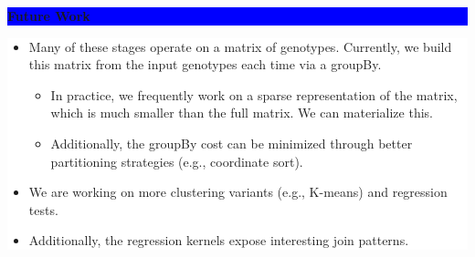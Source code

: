 \documentclass[11pt]{a0poster}
\begin{document}
{\begin{minipage}[t][2045pt][t]{\linewidth}
\begin{minipage}{0.6\linewidth}
\vspace{75pt}
\begin{minipage}{\linewidth}
\colorbox{Blue}{
\begin{minipage}[t]{\linewidth}
\vspace{30pt}
\begin{center}
\Huge \bf \color{White} Future Work
\end{center}
\vspace{17pt}
\end{minipage}
}
\colorbox{White}{
\begin{minipage}[t][420pt][t]{\linewidth}
\begin{minipage}{0.005\linewidth}
\hfill
\pagebreak
\end{minipage}
\begin{minipage}{0.98\linewidth}
\LARGE
\vspace{10pt}
\color{Blue}
\begin{itemize}
\item Many of these stages operate on a matrix of genotypes. Currently, we build
this matrix from the input genotypes each time via a groupBy.
\begin{itemize}
\item In practice, we frequently work on a sparse representation of the matrix,
which is much smaller than the full matrix. We can materialize this.
\item Additionally, the groupBy cost can be minimized through better partitioning
strategies (e.g., coordinate sort).
\end{itemize}
\item We are working on more clustering variants (e.g., K-means) and regression
tests.
\item Additionally, the regression kernels expose interesting join patterns.
\end{itemize}
\end{minipage}
\end{minipage}
}
\end{minipage}
\end{minipage}
\end{minipage}
}
\end{document}
